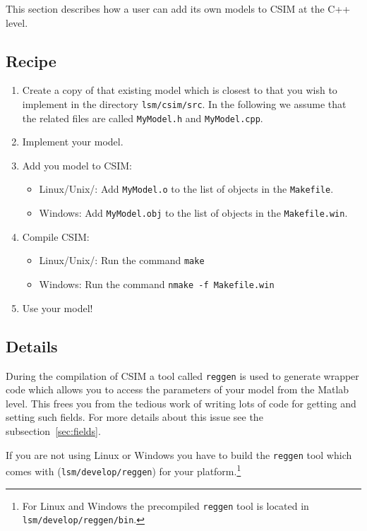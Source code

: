 This section describes how a user can add its own models to CSIM at the C++
level.

\subsection{Recipe}

\begin{enumerate}
  
\item Create a copy of that existing model which is closest to that you wish
  to implement in the directory \verb+lsm/csim/src+. In the following we
  assume that the related files are called \verb+MyModel.h+ and
  \verb+MyModel.cpp+.

\item Implement your model.

\item Add you model to CSIM:
\begin{itemize}
\item Linux/Unix/: Add \verb+MyModel.o+ to the list of objects in the \verb+Makefile+.
\item Windows: Add  \verb+MyModel.obj+ to the list of objects in the \verb+Makefile.win+.
\end{itemize}

\item Compile CSIM:

\begin{itemize}
\item Linux/Unix/: Run the command \verb+make+
\item Windows: Run the command \verb+nmake -f Makefile.win+
\end{itemize}

\item Use your model!

\end{enumerate}

\subsection{Details}

During the compilation of CSIM a tool called \verb+reggen+ is used to generate
wrapper code which allows you to access the parameters of your model from the
Matlab level. This frees you from the tedious work of writing lots of code
for getting and setting such fields. For more details about this issue see the
subsection~\ref{sec:fields}.

If you are not using Linux or Windows you have to build the \texttt{reggen}
tool which comes with \csim (\verb+lsm/develop/reggen+) for your
platform.\footnote{For Linux and Windows the precompiled \texttt{reggen} tool
  is located in \texttt{lsm/develop/reggen/bin}.}


